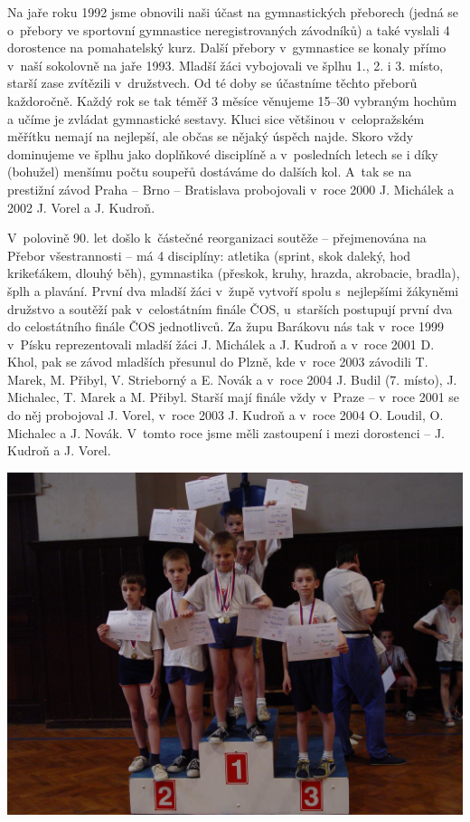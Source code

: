 \documentclass[a5paper, 11pt, twoside]{article}
\begin{document}
Na jaře roku 1992 jsme obnovili naši účast na gymnastických přeborech
(jedná se o~přebory ve sportovní gymnastice neregistrovaných závodníků)
a také vyslali 4 dorostence na pomahatelský kurz. Další přebory
v~gymnastice se konaly přímo v~naší sokolovně na jaře 1993. Mladší žáci
vybojovali ve šplhu 1., 2. i 3. místo, starší zase zvítězili
v~družstvech. Od té doby se účastníme těchto přeborů každoročně. Každý rok
se tak téměř 3 měsíce věnujeme 15--30 vybraným hochům a učíme je zvládat
gymnastické sestavy. Kluci sice většinou v~celopražském měřítku nemají
na nejlepší, ale občas se nějaký úspěch najde. Skoro vždy dominujeme ve
šplhu jako doplňkové disciplíně a v~posledních letech se i díky
(bohužel) menšímu počtu soupeřů dostáváme do dalších kol. A~tak se na
prestižní závod Praha -- Brno -- Bratislava probojovali v~roce 2000 J.
Michálek a 2002 J. Vorel a J. Kudroň.

V~polovině 90. let došlo k~částečné reorganizaci soutěže -- přejmenována
na Přebor všestrannosti -- má 4 disciplíny: atletika (sprint, skok
daleký, hod krikeťákem, dlouhý běh), gymnastika (přeskok, kruhy, hrazda,
akrobacie, bradla), šplh a plavání. První dva mladší žáci v~župě vytvoří
spolu s~nejlepšími žákyněmi družstvo a soutěží pak v~celostátním finále
ČOS, u~starších postupují první dva do celostátního finále ČOS
jednotlivců. Za župu Barákovu nás tak v~roce 1999 v~Písku reprezentovali
mladší žáci J. Michálek a J. Kudroň a v~roce 2001 D. Khol, pak se závod
mladších přesunul do Plzně, kde v~roce 2003 závodili T. Marek, M.
Přibyl, V. Strieborný a E. Novák a v~roce 2004 J. Budil (7. místo), J.
Michalec, T. Marek a M. Přibyl. Starší mají finále vždy v~Praze --
v~roce 2001 se do něj probojoval J. Vorel, v~roce 2003 J. Kudroň a v~roce
2004 O. Loudil, O. Michalec a J. Novák. V~tomto roce jsme měli
zastoupení i mezi dorostenci -- J. Kudroň a J. Vorel.

 \includegraphics[width=\textwidth]{img/42_vitezove_gumnastika.JPG}
\end{document}
